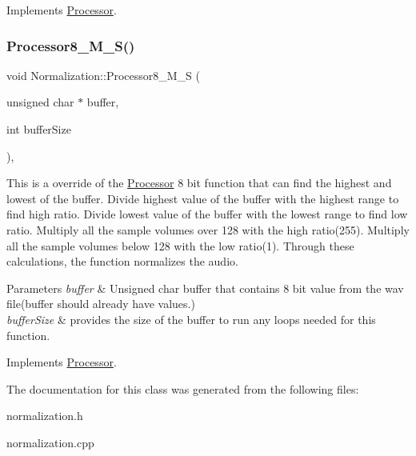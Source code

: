 Implements \hyperlink{classProcessor}{Processor}.

\mbox{\label{classNormalization_ab1303e7cd41e3ec49edafd7b83cb5480}} 
\subsubsection{\texorpdfstring{Processor8\+\_\+\+M\+\_\+\+S()}{Processor8\_M\_S()}}
{\footnotesize\ttfamily void Normalization\+::\+Processor8\+\_\+\+M\+\_\+S (\begin{DoxyParamCaption}\item[{unsigned char $\ast$}]{buffer,  }\item[{int}]{buffer\+Size }\end{DoxyParamCaption})\hspace{0.3cm}{\ttfamily [override]}, {\ttfamily [virtual]}}



This is a override of the \hyperlink{classProcessor}{Processor} 8 bit function that can find the highest and lowest of the buffer. Divide highest value of the buffer with the highest range to find high ratio. Divide lowest value of the buffer with the lowest range to find low ratio. Multiply all the sample volumes over 128 with the high ratio(255). Multiply all the sample volumes below 128 with the low ratio(1). Through these calculations, the function normalizes the audio. 


\begin{DoxyParams}{Parameters}
{\em buffer} & Unsigned char buffer that contains 8 bit value from the wav file(buffer should already have values.) \\
\hline
{\em buffer\+Size} & provides the size of the buffer to run any loops needed for this function. \\
\hline
\end{DoxyParams}


Implements \hyperlink{classProcessor}{Processor}.



The documentation for this class was generated from the following files\+:\begin{DoxyCompactItemize}
\item 
normalization.\+h\item 
normalization.\+cpp\end{DoxyCompactItemize}
